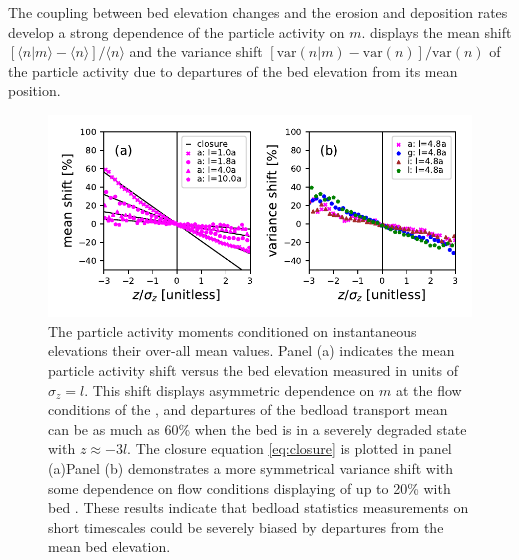 The coupling between bed elevation changes and the erosion and deposition rates develop a strong dependence of the particle activity on $m$. \DIFdelbegin {}\DIFdelend \DIFaddbegin {}\DIFaddend displays the mean shift $[\langle n |m \rangle - \langle n \rangle]/\langle n \rangle $ and the variance shift  $[\text{var}(n|m) - \text{var}(n)]/\text{var}(n)$ of the particle activity due to departures of the bed elevation from its mean position.
\begin{figure}[!htbp]
	\includegraphics[width=\linewidth,keepaspectratio]{./figures/ch3/momentsuppression.pdf}
	\caption{The \DIFdelbeginFL {}\DIFdelendFL particle activity moments conditioned on instantaneous \DIFaddbeginFL {}\DIFaddendFL elevations \DIFdelbeginFL {}\DIFdelendFL \DIFaddbeginFL {}\DIFaddendFL their over-all mean values. Panel (a) indicates the mean particle activity shift versus the bed elevation measured in units of $\sigma_z=l$. This shift displays asymmetric dependence on $m$ at the flow conditions of the \citet{Ancey2008} \DIFdelbeginFL {}\DIFdelendFL \DIFaddbeginFL {}\DIFaddendFL , and departures of the bedload transport mean can be as much as 60\% when the bed is in a severely degraded state with $z\approx -3l$. The closure equation \DIFdelbeginFL \DIFdelFL{(}\DIFdelendFL \ref{eq:closure} \DIFdelbeginFL \DIFdelFL{) }\DIFdelendFL is plotted in panel (a)\DIFaddbeginFL {}\DIFaddendFL Panel (b) demonstrates a more symmetrical variance shift with some dependence on flow conditions displaying \DIFdelbeginFL {}\DIFdelendFL \DIFaddbeginFL {}\DIFaddendFL of up to 20\% with bed \DIFdelbeginFL {}\DIFdelendFL \DIFaddbeginFL {}\DIFaddendFL . These results indicate that bedload statistics measurements on short timescales could be severely biased by departures from the mean bed elevation.}
	\label{fig:condmoms}
\end{figure}
